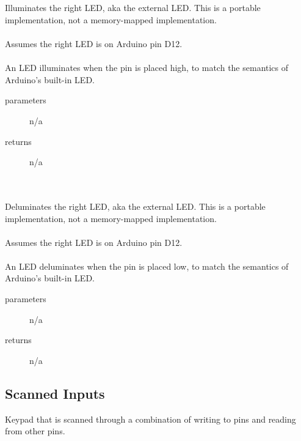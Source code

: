 \begin{itemize}
         \\ \\
            Illuminates the right LED, aka the external LED\@.
            This is a portable implementation, not a memory-mapped implementation. \\ \\
            Assumes the right LED is on Arduino pin D12. \\ \\
            An LED illuminates when the pin is placed high, to match the semantics of Arduino's built-in LED\@.
            \begin{description}
                \item[parameters] n/a
                \item[returns] n/a
            \end{description}

         \\ \\
            Deluminates the right LED, aka the external LED\@.
            This is a portable implementation, not a memory-mapped implementation. \\ \\
            Assumes the right LED is on Arduino pin D12. \\ \\
            An LED deluminates when the pin is placed low, to match the semantics of Arduino's built-in LED\@.
            \begin{description}
                \item[parameters] n/a
                \item[returns] n/a
            \end{description}

    \end{itemize}


    \subsection{Scanned Inputs}\label{subsec:ScannedInputs}

        Keypad that is scanned through a combination of writing to pins and reading from other pins.


